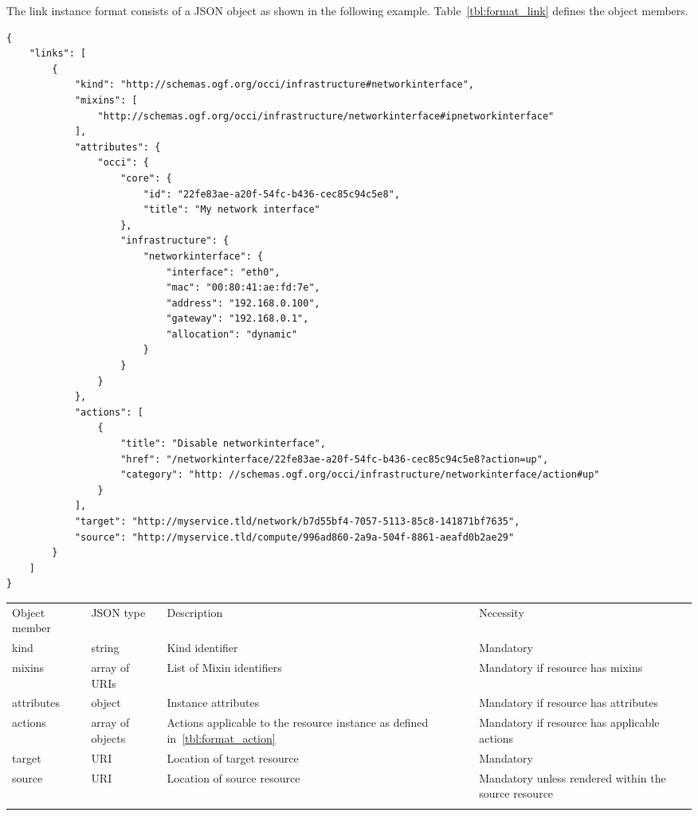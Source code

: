 \documentclass[10pt,a4paper]{article}
\begin{document}
The link instance format consists of a JSON object as shown in the
following example.
Table~\ref{tbl:format_link} defines the object members.
\begin{verbatim}
{
    "links": [
        {
            "kind": "http://schemas.ogf.org/occi/infrastructure#networkinterface",
            "mixins": [
                "http://schemas.ogf.org/occi/infrastructure/networkinterface#ipnetworkinterface"
            ],
            "attributes": {
                "occi": {
                    "core": {
                        "id": "22fe83ae-a20f-54fc-b436-cec85c94c5e8",
		                "title": "My network interface"
                    },
                    "infrastructure": {
                        "networkinterface": {
                            "interface": "eth0",
                            "mac": "00:80:41:ae:fd:7e",
                            "address": "192.168.0.100",
                            "gateway": "192.168.0.1",
                            "allocation": "dynamic"
                        }
                    }
                }
            },
            "actions": [
                {
                    "title": "Disable networkinterface",
                    "href": "/networkinterface/22fe83ae-a20f-54fc-b436-cec85c94c5e8?action=up",
                    "category": "http: //schemas.ogf.org/occi/infrastructure/networkinterface/action#up"
                }
            ],
            "target": "http://myservice.tld/network/b7d55bf4-7057-5113-85c8-141871bf7635",
            "source": "http://myservice.tld/compute/996ad860-2a9a-504f-8861-aeafd0b2ae29"
        }
    ]
}
\end{verbatim}
 {
    \begin{tabular}{llp{5.0cm}p{3.0cm}}
    \toprule
    Object member & JSON type & Description & Necessity \\
    \colrule
    kind & string & Kind identifier & Mandatory \\

    mixins & array of URIs & List of Mixin identifiers &
    Mandatory if resource has mixins \\

    attributes & object & Instance attributes & Mandatory if resource has attributes \\

    actions & array of objects & Actions applicable to the resource instance as defined in~\ref{tbl:format_action} &
    Mandatory if resource has applicable actions \\
        
    target & URI & Location of target resource & Mandatory \\
    
    source & URI & Location of source resource & Mandatory unless rendered within the source resource\\
    \botrule
    \end{tabular}
}
\end{document}

